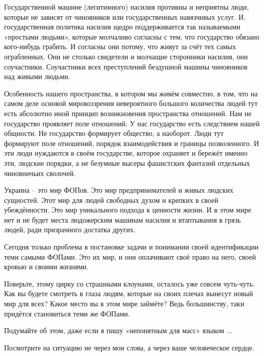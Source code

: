 Государственной машине (легитимного) насилия противны и неприятны люди, которые
не зависят от чиновников или государственных навязчивых услуг. И.
государственная политика насилия щедро поддерживается так называемыми «простыми
людьми», которые молчаливо согласны с тем, что государство обязано кого-нибудь
грабить. И согласны они потому, что живут за счёт тех самых ограбленных. Они не
столько свидетели и молчащие сторонники насилия, они соучастники. Соучастники
всех преступлений бездушной машины чиновников над живыми людьми.

Особенность нашего пространства, в котором мы живём совместно, в том, что на
самом деле основой мировоззрения невероятного большого количества людей тут
есть абсолютно иной принцип возникновения пространства отношений. Нам не
государство проявляет поле отношений. У нас государство есть следствием нашей
общности. Не государство формирует общество, а наоборот. Люди тут формируют
поле отношений, порядок взаимодействия и границы позволенного. И эти люди
нуждаются в своём государстве, которое охраняет и бережёт именно эти, людские
порядки, а не безумные высеры фашистских фантазий отдельных чиновничьих
сволочей.

Украина – это мир ФОПов. Это мир предпринимателей и живых людских сущностей.
Этот мир для людей свободных духом и крепких в своей убеждённости. Это мир
уникального подхода к ценности жизни. И в этом мире нет и не будет места
людожерским машинам насилия и втаптывания в грязь людей, ради призрачного
достатка других.

Сегодня только проблема в постановке задачи и понимании своей идентификации
теми самыми ФОПами. Это их мир, и они оплачивают своё право на него, своей
кровью и своими жизнями.

Поверьте, этому цирку со страшными клоунами, осталось уже совсем чуть-чуть. Как
вы будете смотреть в глаза людям, которые на своих плечах вынесут новый мир для
всех? Какое место вы в этом мире займёте? Ведь большинству, таки придётся
становиться теми же ФОПами. 

Подумайте об этом, даже если я пишу «непонятным для масс» языком ...

Посмотрите на ситуацию не через мои слова, а через ваше человеческое сердце.
